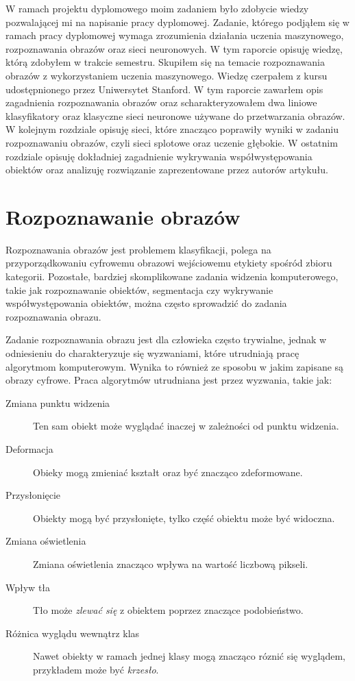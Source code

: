 \documentclass[a4paper,11pt, notitlepage, twosides, openany ]{report}
\begin{document}
	W ramach projektu dyplomowego moim zadaniem było zdobycie wiedzy pozwalającej mi na napisanie pracy dyplomowej. Zadanie, którego podjąłem się w ramach pracy dyplomowej wymaga zrozumienia działania uczenia maszynowego, rozpoznawania obrazów oraz sieci neuronowych. W tym raporcie opisuję wiedzę, którą zdobyłem w trakcie semestru. Skupiłem się na temacie rozpoznawania obrazów z wykorzystaniem uczenia maszynowego. Wiedzę czerpałem z kursu udostępnionego przez Uniwersytet Stanford\cite{cs231n}. W tym raporcie zawarłem opis zagadnienia rozpoznawania obrazów oraz scharakteryzowałem dwa liniowe klasyfikatory oraz klasyczne sieci neuronowe używane do przetwarzania obrazów. W kolejnym rozdziale opisuję sieci, które znacząco poprawiły wyniki w zadaniu rozpoznawaniu obrazów, czyli sieci splotowe oraz uczenie głębokie. W ostatnim rozdziale opisuję dokładniej zagadnienie wykrywania współwystępowania obiektów oraz analizuję rozwiązanie zaprezentowane przez autorów artykułu\cite{Zhang_2019_CVPR}.
	

	\chapter{Rozpoznawanie obrazów}
	Rozpoznawania obrazów jest problemem klasyfikacji, polega na przyporządkowaniu cyfrowemu obrazowi wejściowemu etykiety spośród zbioru kategorii. Pozostałe, bardziej skomplikowane zadania widzenia komputerowego, takie jak rozpoznawanie obiektów, segmentacja czy wykrywanie współwystępowania obiektów, można często sprowadzić do zadania rozpoznawania obrazu. 

	Zadanie rozpoznawania obrazu jest dla człowieka często trywialne, jednak w odniesieniu do charakteryzuje się wyzwaniami, które utrudniają pracę algorytmom komputerowym. Wynika to również ze sposobu w jakim zapisane są obrazy cyfrowe. Praca algorytmów utrudniana jest przez wyzwania, takie jak:

	\begin{description}
		\item[Zmiana punktu widzenia] Ten sam obiekt może wyglądać inaczej w zależności od punktu widzenia.
		\item[Deformacja] Obieky mogą zmieniać kształt oraz być znacząco zdeformowane.
		\item[Przysłonięcie] Obiekty mogą być przysłonięte, tylko część obiektu może być widoczna.
		\item[Zmiana oświetlenia] Zmiana oświetlenia znacząco wpływa na wartość liczbową pikseli.
		\item[Wpływ tła] Tło może \textit{zlewać się} z obiektem poprzez znaczące podobieństwo.
		\item[Różnica wyglądu wewnątrz klas] Nawet obiekty w ramach jednej klasy mogą znacząco róznić się wyglądem, przykładem może być \textit{krzesło}.        
	\end{description}
\end{document}
